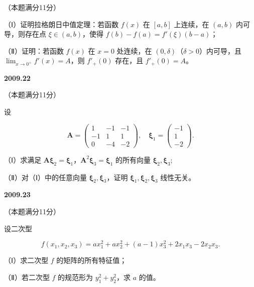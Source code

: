 \documentclass[UTF8,12pt,fontset=windows]{ctexart}
\begin{document}
（本题满分11分）

（Ⅰ）证明拉格朗日中值定理：若函数 $f(x)$ 在 $[a, b]$ 上连续，在 $(a, b)$ 内可导，则存在点 $\xi \in (a, b)$，使得 $f(b) - f(a) = f'(\xi)(b - a)$；

（Ⅱ）证明：若函数 $f(x)$ 在 $x = 0$ 处连续，在 $(0, \delta)$（$\delta > 0$）内可导，且 $\lim_{x \to 0^+} f'(x) = A$，则 $f'_+(0)$ 存在，且 $f'_+(0) = A$。

\vfill
\newpage
{\large\bfseries 2009.22}

（本题满分11分）

设

$$
\boldsymbol{A} = \begin{pmatrix} 1 & -1 & -1 \\ -1 & 1 & 1 \\ 0 & -4 & -2 \end{pmatrix}, \quad \boldsymbol{\xi}_1 = \begin{pmatrix} -1 \\ 1 \\ -2 \end{pmatrix}.
$$

（Ⅰ）求满足 $\boldsymbol{A\xi}_2 = \boldsymbol{\xi}_1$，$\boldsymbol{A}^2\boldsymbol{\xi}_3 = \boldsymbol{\xi}_1$ 的所有向量 $\boldsymbol{\xi}_2, \boldsymbol{\xi}_3$;

（Ⅱ）对（Ⅰ）中的任意向量 $\boldsymbol{\xi}_2, \boldsymbol{\xi}_3$，证明 $\boldsymbol{\xi}_1, \boldsymbol{\xi}_2, \boldsymbol{\xi}_3$ 线性无关。

\vfill
\newpage
{\large\bfseries 2009.23}

（本题满分11分）

设二次型

$$
f(x_1, x_2, x_3) = ax_1^2 + ax_2^2 + (a-1)x_3^2 + 2x_1 x_3 - 2x_2 x_3.
$$

（Ⅰ）求二次型 $f$ 的矩阵的所有特征值；

（Ⅱ）若二次型 $f$ 的规范形为 $y_1^2 + y_2^2$，求 $a$ 的值。

\vfill
\end{document}
